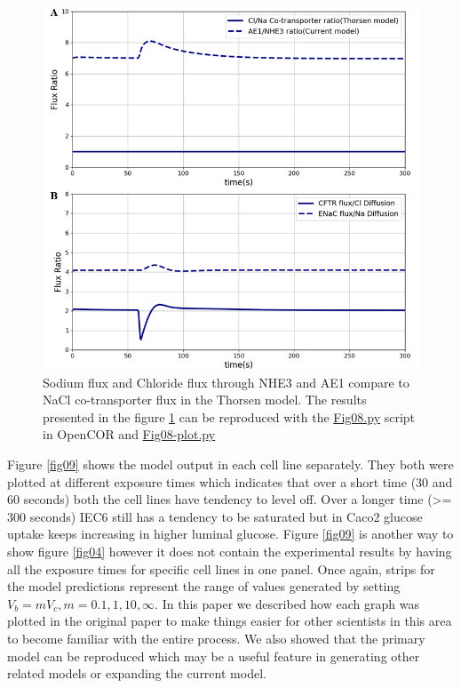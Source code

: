 \documentclass[fleqn,10pt]{physiome}
\begin{document}
\begin{figure}[ht]
\centering
\includegraphics[width=0.75\linewidth]{fig08.png}
\caption{Sodium flux and Chloride flux through NHE3 and AE1 compare to NaCl co-transporter flux in the Thorsen model. The results presented in the figure \ref{fig08} can be reproduced with the \href{https://models.physiomeproject.org/workspace/572/file/c052b0c460280139dad150937fbee4fa6a026505/SEDML_files/Fig08.py}{Fig08.py} script in OpenCOR and \href{https://models.physiomeproject.org/workspace/572/file/c052b0c460280139dad150937fbee4fa6a026505/SEDML_files/Fig08_plot.py}{Fig08-plot.py}}
\label{fig08}
\end{figure}\newpage

Figure \ref{fig09} shows the model output in each cell line separately. They both were plotted at different exposure times which indicates that over a short time (30 and 60 seconds) both the cell lines have tendency to level off. Over a longer time (>= 300 seconds) IEC6 still has a tendency to be saturated but in Caco2 glucose uptake keeps increasing in higher luminal glucose. Figure \ref{fig09} is another way to show figure \ref{fig04} however it does not contain the experimental results by having all the exposure times for specific cell lines in one panel. Once again, strips for the model predictions represent the range of values generated by setting $V_b = m V_c, m = 0.1, 1, 10, \infty$. In this paper we described how each graph was plotted in the original paper to make things easier for other scientists in this area to become familiar with the entire process. We also showed that the primary model can be reproduced which may be a useful feature in generating other related models or expanding the current model.
\end{document}
